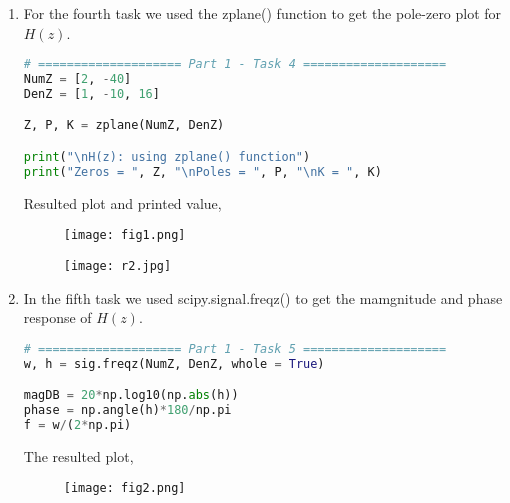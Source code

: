 \documentclass[12pt,a4paper]{article}
\begin{document}
\begin{itemize}
\begin{enumerate}
    \item
    For the fourth task we used the zplane() function to get the pole-zero plot for $H(z)$.

\begin{lstlisting}[language=Python, caption={Task 4, Part 1}, label={lst:code}, mathescape=true, breaklines=true]
# ==================== Part 1 - Task 4 ====================
NumZ = [2, -40]
DenZ = [1, -10, 16]

Z, P, K = zplane(NumZ, DenZ)

print("\nH(z): using zplane() function")
print("Zeros = ", Z, "\nPoles = ", P, "\nK = ", K)
\end{lstlisting}

Resulted plot and printed value,

\begin{figure}[h]
    \centering
    \texttt{[image: fig1.png]}
\end{figure}\textbf{}
\clearpage

\begin{figure}[h]
    \centering
    \texttt{[image: r2.jpg]}
\end{figure}\textbf{}

    \item
    In the fifth task we used scipy.signal.freqz() to get the mamgnitude and phase response of $H(z)$.

\begin{lstlisting}[language=Python, caption={Task 5, Part 1}, label={lst:code}, mathescape=true, breaklines=true]
# ==================== Part 1 - Task 5 ====================
w, h = sig.freqz(NumZ, DenZ, whole = True)

magDB = 20*np.log10(np.abs(h))
phase = np.angle(h)*180/np.pi
f = w/(2*np.pi)
\end{lstlisting}

The resulted plot,

\begin{figure}[h]
    \centering
    \texttt{[image: fig2.png]}
\end{figure}\textbf{}
\end{enumerate}   
\end{itemize}

\end{document}
